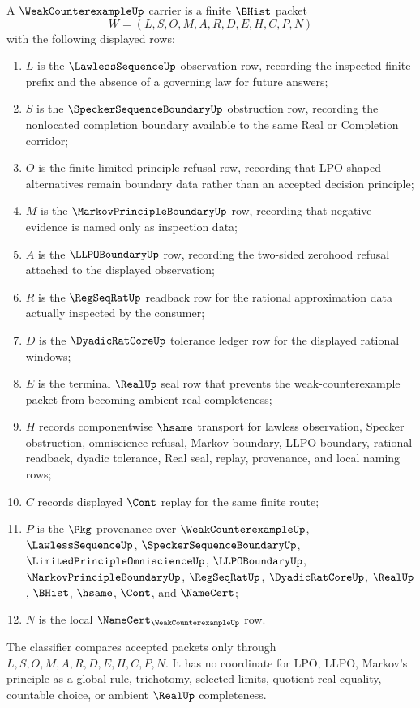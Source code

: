 \begin{definition}
\label{def:weak-counterexample-carrier}
A $\WeakCounterexampleUp$ carrier is a finite $\BHist$ packet
$$
W=(L,S,O,M,A,R,D,E,H,C,P,N)
$$
with the following displayed rows:
\begin{enumerate}
\item $L$ is the $\LawlessSequenceUp$ observation row, recording the inspected finite prefix and the absence of a governing law for future answers;
\item $S$ is the $\SpeckerSequenceBoundaryUp$ obstruction row, recording the nonlocated completion boundary available to the same Real or Completion corridor;
\item $O$ is the finite limited-principle refusal row, recording that LPO-shaped alternatives remain boundary data rather than an accepted decision principle;
\item $M$ is the $\MarkovPrincipleBoundaryUp$ row, recording that negative evidence is named only as inspection data;
\item $A$ is the $\LLPOBoundaryUp$ row, recording the two-sided zerohood refusal attached to the displayed observation;
\item $R$ is the $\RegSeqRatUp$ readback row for the rational approximation data actually inspected by the consumer;
\item $D$ is the $\DyadicRatCoreUp$ tolerance ledger row for the displayed rational windows;
\item $E$ is the terminal $\RealUp$ seal row that prevents the weak-counterexample packet from becoming ambient real completeness;
\item $H$ records componentwise $\hsame$ transport for lawless observation, Specker obstruction, omniscience refusal, Markov-boundary, LLPO-boundary, rational readback, dyadic tolerance, Real seal, replay, provenance, and local naming rows;
\item $C$ records displayed $\Cont$ replay for the same finite route;
\item $P$ is the $\Pkg$ provenance over $\WeakCounterexampleUp$, $\LawlessSequenceUp$, $\SpeckerSequenceBoundaryUp$, $\LimitedPrincipleOmniscienceUp$, $\LLPOBoundaryUp$, $\MarkovPrincipleBoundaryUp$, $\RegSeqRatUp$, $\DyadicRatCoreUp$, $\RealUp$, $\BHist$, $\hsame$, $\Cont$, and $\NameCert$;
\item $N$ is the local $\NameCert_{\WeakCounterexampleUp}$ row.
\end{enumerate}
The classifier compares accepted packets only through $L,S,O,M,A,R,D,E,H,C,P,N$. It has no coordinate for LPO, LLPO, Markov's principle as a global rule, trichotomy, selected limits, quotient real equality, countable choice, or ambient $\RealUp$ completeness.
\end{definition}

